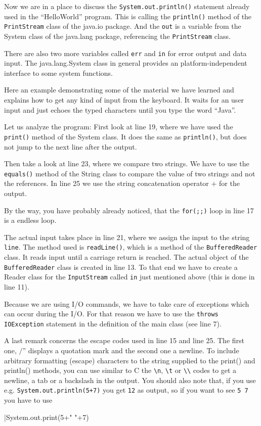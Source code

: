 Now we are in a place to discuss the \verb|System.out.println()| statement
already used in the ``HelloWorld'' program. This is calling the
\verb|println()| method of the \verb|PrintStream| class of the java.io 
package. And the \verb|out| is a variable from the System 
class of the java.lang package, referencing the \verb|PrintStream| class. 

There are also two more variables called \verb|err| and
\verb|in| for error output and data input. 
The java.lang.System class in general provides an platform-independent 
interface to some system functions.

Here an example demonstrating some of the material we have learned and
explains how to get any kind of input from the keyboard.
It waits for an user input and just echoes the typed characters
until you type the word ``Java''. 

Let us analyze the program:
First look at line 19, where we have used the \verb|print()| method
of the System class. It does the same as \verb|println()|, but does not
jump to the next line after the output.

Then take a look at line 23, where we compare two strings. 
We have to use the \verb|equals()| method of the String class to
compare the value of two strings and not the references. 
In line 25 we use the string concatenation operator $+$ for the output.

By the way, you have probably already noticed, that 
the \verb|for(;;)| loop in line 17 is a endless loop.

The actual input takes place in line 21, where we assign the input
to the string \verb|line|. The method used is \verb|readLine()|, which
is a method of the \verb|BufferedReader| class. It reads input until
a carriage return is reached. The actual object of the 
\verb|BufferedReader| class is created in line 13. To that end we have
to create a Reader class for the \verb|InputStream| called \verb|in|
just mentioned above (this is done in line 11).

Because we are using I/O commands, we have to take care of exceptions
which can occur during the I/O. For that reason we have to use the
\verb|throws IOException| statement in the definition of the main
class (see line 7).

A last remark concerns the escape codes used in line 15 and line 25.
The first one, $/$'' displays a quotation mark and the second
one a newline.
To include arbitrary formatting (escape) characters
to the string supplied to the print() and println() methods, you
can use similar to C the \verb|\n|, \verb|\t| or \verb|\\| codes
to get a newline, a tab or a backslash in the output. You should 
also note that, if you use e.g. \verb|System.out.println(5+7)| you
get \verb|12| as output, so if you want to see \verb|5 7| you have
to use 
\begin{sverbatim}
|System.out.print(5+" "+7)
\end{sverbatim}

